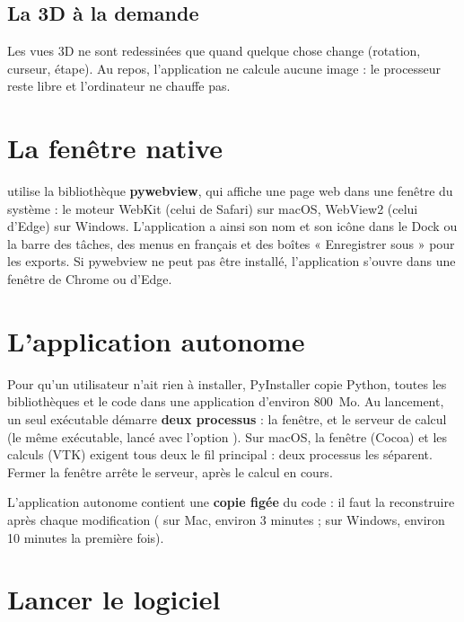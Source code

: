 \subsection{La 3D à la demande}

Les vues 3D ne sont redessinées que quand quelque chose change (rotation, curseur, étape). Au repos, l'application ne
calcule aucune image : le processeur reste libre et l'ordinateur ne chauffe pas.

\section{La fenêtre native}

 utilise la bibliothèque \textbf{pywebview}, qui affiche une page web dans une fenêtre
du système : le moteur WebKit (celui de Safari) sur macOS, WebView2 (celui d'Edge) sur Windows. L'application a ainsi
son nom et son icône dans le Dock ou la barre des tâches, des menus en français et des boîtes « Enregistrer sous » pour
les exports. Si pywebview ne peut pas être installé, l'application s'ouvre dans une fenêtre de Chrome ou d'Edge.

\section{L'application autonome}

Pour qu'un utilisateur n'ait rien à installer, PyInstaller copie Python, toutes les bibliothèques et le code dans une
application d'environ 800~Mo. Au lancement, un seul exécutable démarre \textbf{deux processus} : la fenêtre, et le
serveur de calcul (le même exécutable, lancé avec l'option ). Sur macOS, la fenêtre (Cocoa) et les
calculs (VTK) exigent tous deux le fil principal : deux processus les séparent. Fermer la fenêtre arrête le serveur,
après le calcul en cours.

\begin{attention}
L'application autonome contient une \textbf{copie figée} du code : il faut la reconstruire après chaque modification
( sur Mac, environ 3 minutes ;
 sur Windows, environ 10 minutes la première fois).
\end{attention}

\section{Lancer le logiciel}
\label{sec:lancer}

